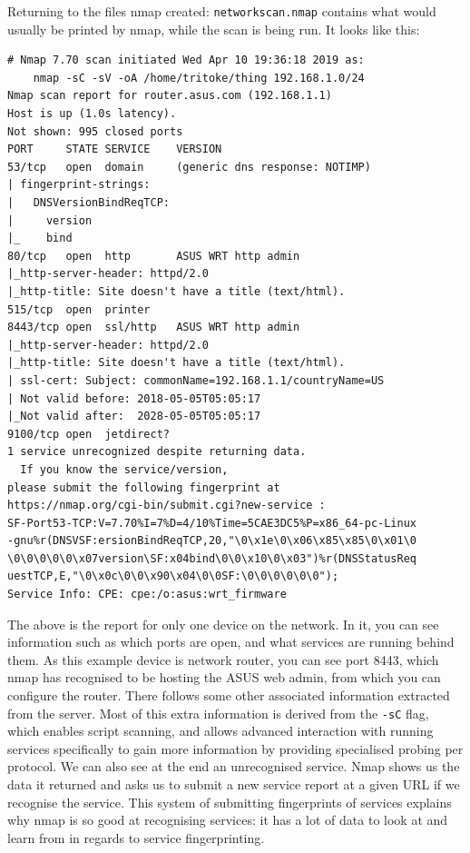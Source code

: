 \documentclass[titlepage]{article}
\begin{document}
Returning to the files nmap created: \verb|networkscan.nmap| contains what would usually
be printed by nmap, while the scan is being run.
It looks like this:
\begin{verbatim}
# Nmap 7.70 scan initiated Wed Apr 10 19:36:18 2019 as:
    nmap -sC -sV -oA /home/tritoke/thing 192.168.1.0/24
Nmap scan report for router.asus.com (192.168.1.1)
Host is up (1.0s latency).
Not shown: 995 closed ports
PORT     STATE SERVICE    VERSION
53/tcp   open  domain     (generic dns response: NOTIMP)
| fingerprint-strings: 
|   DNSVersionBindReqTCP: 
|     version
|_    bind
80/tcp   open  http       ASUS WRT http admin
|_http-server-header: httpd/2.0
|_http-title: Site doesn't have a title (text/html).
515/tcp  open  printer
8443/tcp open  ssl/http   ASUS WRT http admin
|_http-server-header: httpd/2.0
|_http-title: Site doesn't have a title (text/html).
| ssl-cert: Subject: commonName=192.168.1.1/countryName=US
| Not valid before: 2018-05-05T05:05:17
|_Not valid after:  2028-05-05T05:05:17
9100/tcp open  jetdirect?
1 service unrecognized despite returning data.
  If you know the service/version,
please submit the following fingerprint at
https://nmap.org/cgi-bin/submit.cgi?new-service :
SF-Port53-TCP:V=7.70%I=7%D=4/10%Time=5CAE3DC5%P=x86_64-pc-Linux
-gnu%r(DNSVSF:ersionBindReqTCP,20,"\0\x1e\0\x06\x85\x85\0\x01\0 
\0\0\0\0\0\x07version\SF:x04bind\0\0\x10\0\x03")%r(DNSStatusReq
uestTCP,E,"\0\x0c\0\0\x90\x04\0\0SF:\0\0\0\0\0\0");
Service Info: CPE: cpe:/o:asus:wrt_firmware
\end{verbatim}
The above is the report for only one device on the network.
In it, you can see information such as which ports are open, and what services are running behind them.
As this example device is network router, you can see port 8443, which nmap has recognised to be hosting
the ASUS web admin, from which you can configure the router.
There follows some other associated information extracted from the server.
Most of this extra information is derived from the \verb|-sC| flag,
which enables script scanning,
and allows advanced interaction with running services specifically to gain more
information by providing specialised probing per protocol. We can also see at the end an
unrecognised service. Nmap shows us the data it returned and asks us to submit a new service
report at a given URL if we recognise the service. This system of submitting fingerprints of
services explains why nmap is so good at recognising services: it has a lot of data to look at and learn
from in regards to service fingerprinting.
\end{document}
